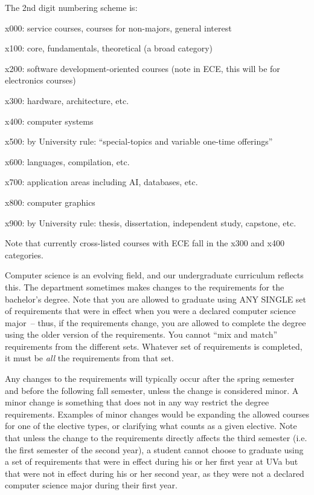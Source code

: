 The 2nd digit numbering scheme is:

\begin{itemlist}
\item x000: service courses, courses for non-majors, general interest
\item x100: core, fundamentals, theoretical (a broad category)
\item x200: software development-oriented courses (note in ECE, this will
 be for electronics courses)
\item x300: hardware, architecture, etc.
\item x400: computer systems
\item x500: by University rule: ``special-topics and variable one-time
 offerings''
\item x600: languages, compilation, etc.
\item x700: application areas including AI, databases, etc.
\item x800: computer graphics
\item x900: by University rule: thesis, dissertation, independent
 study, capstone, etc.
\end{itemlist}

Note that currently cross-listed courses with ECE fall in the x300 and
x400 categories.

\label{sec:degreerevisions}

Computer science is an evolving field, and our undergraduate
curriculum reflects this. The department sometimes makes changes to
the requirements for the bachelor's degree. Note that you are allowed
to graduate using ANY SINGLE set of requirements that were in effect
when you were a declared computer science major~-- thus, if the
requirements change, you are allowed to complete the degree using the
older version of the requirements. You cannot ``mix and match''
requirements from the different sets. Whatever set of requirements is
completed, it must be {\em all} the requirements from that set.

Any changes to the requirements will typically occur after the spring
semester and before the following fall semester, unless the change is
considered minor. A minor change is something that does not in any way
restrict the degree requirements. Examples of minor changes would be
expanding the allowed courses for one of the elective types, or
clarifying what counts as a given elective. Note that unless the
change to the requirements directly affects the third semester (i.e.
the first semester of the second year), a student cannot choose to
graduate using a set of requirements that were in effect during his or
her first year at UVa but that were not in effect during his or her
second year, as they were not a declared computer science major during
their first year.

